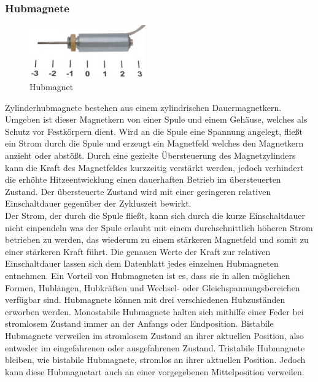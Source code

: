 \subsubsection{Hubmagnete}
\begin{figure}[H] 
\begin{center}

\includegraphics[width=5cm]{Bilder/Bauteile/Hubmagnet}
\caption{Hubmagnet}
\label{Hubmagnet}

\end{center}
\end{figure}
Zylinderhubmagnete bestehen aus einem zylindrischen Dauermagnetkern. Umgeben ist dieser Magnetkern von einer Spule und einem Gehäuse, welches als Schutz vor Festkörpern dient. Wird an die Spule eine Spannung angelegt, fließt ein Strom durch die Spule und erzeugt ein Magnetfeld welches den Magnetkern anzieht oder abstößt. Durch eine gezielte Übersteuerung des Magnetzylinders kann die Kraft des Magnetfeldes kurzzeitig verstärkt werden, jedoch verhindert die erhöhte Hitzeentwicklung einen dauerhaften Betrieb im übersteuerten Zustand. Der übersteuerte Zustand wird mit einer geringeren relativen Einschaltdauer gegenüber der Zykluszeit bewirkt. \\Der Strom, der durch die Spule fließt, kann sich durch die kurze Einschaltdauer nicht einpendeln was der Spule erlaubt mit einem durchschnittlich höheren Strom betrieben zu werden, das wiederum zu einem stärkeren Magnetfeld und somit zu einer stärkeren Kraft führt. Die genauen Werte der Kraft zur relativen Einschaltdauer lassen sich dem Datenblatt jedes einzelnen Hubmagneten entnehmen. Ein Vorteil von Hubmagneten ist es, dass sie in allen möglichen Formen, Hublängen, Hubkräften und Wechsel- oder Gleichspannungsbereichen verfügbar sind. Hubmagnete können mit drei verschiedenen Hubzuständen erworben werden. Monostabile Hubmagnete halten sich mithilfe einer Feder bei stromlosem Zustand immer an der Anfangs oder Endposition. Bistabile Hubmagnete verweilen im stromlosem Zustand an ihrer aktuellen Position, also entweder im eingefahrenen oder ausgefahrenen Zustand. Tristabile Hubmagnete bleiben, wie bistabile Hubmagnete, stromlos an ihrer aktuellen Position. Jedoch kann diese Hubmagnetart auch an einer vorgegebenen Mittelposition verweilen.

